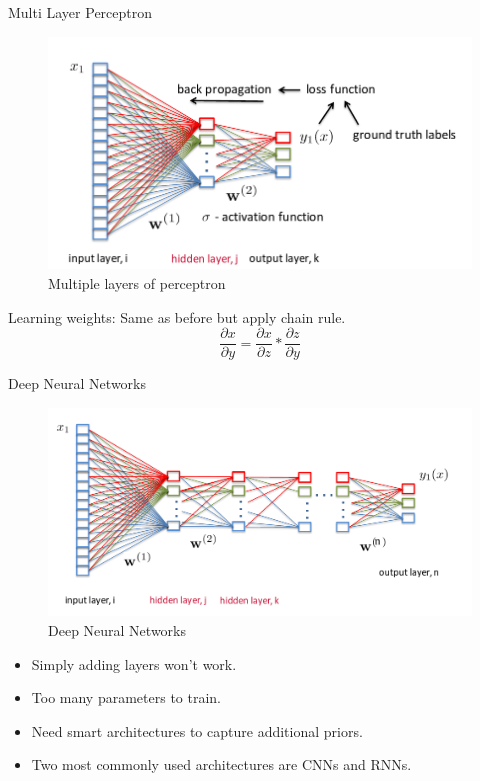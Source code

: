 ﻿\documentclass[table,aspectratio=43,mathserif,xcolor={usenames,dvipsnames,svgnames,table},10pt]{beamer}
\begin{document}
\begin{frame}{Multi Layer Perceptron}
\begin{figure}[h]
    \includegraphics[width=0.7\linewidth]{images/mlp.png}  
    \caption{Multiple layers of perceptron}
  \end{figure}
  Learning weights: Same as before but apply chain rule.
  $$ \frac{\partial x}{\partial y}  = \frac{\partial x}{\partial z} * \frac{\partial z}{\partial y} $$
\end{frame}

\begin{frame}{Deep Neural Networks}
 \begin{figure}[h]
    \includegraphics[width=0.7\linewidth]{images/dnn.png}  
    \caption{Deep Neural Networks}
  \end{figure}
  \begin{itemize}
   \item<+-> Simply adding layers won't work.
   \item<+-> Too many parameters to train.
   \item<+-> Need smart architectures to capture additional priors.
   \item<+-> Two most commonly used architectures are CNNs and RNNs.
  \end{itemize}
\end{frame}
\end{document}

